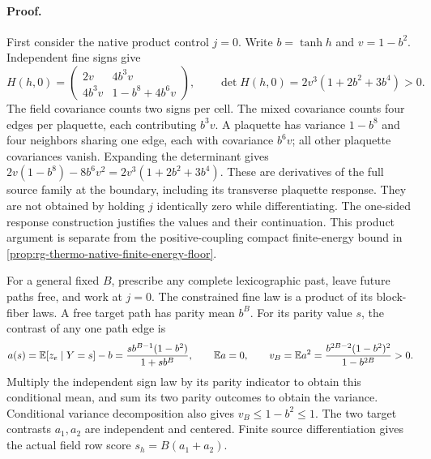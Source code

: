 \paragraph{Proof.}
First consider the native product control \(j=0\). Write
\(b=\tanh h\) and \(v=1-b^2\). Independent fine signs give
\begin{equation}
 H(h,0)=\begin{pmatrix}
 2v&4b^3v\\
 4b^3v&1-b^8+4b^6v
 \end{pmatrix},\qquad
 \det H(h,0)=2v^3(1+2b^2+3b^4)>0.
 \label{eq:rg-thermo-native-product-hessian}
\end{equation}
The field covariance counts two signs per cell. The mixed covariance
counts four edges per plaquette, each contributing \(b^3v\). A plaquette
has variance \(1-b^8\) and four neighbors sharing one edge, each with
covariance \(b^6v\); all other plaquette covariances vanish. Expanding
the determinant gives
\(2v(1-b^8)-8b^6v^2=2v^3(1+2b^2+3b^4)\).
These are derivatives of the full source family at the boundary, including
its transverse plaquette response. They are not obtained by holding
\(j\) identically zero while differentiating. The one-sided response
construction justifies the values and their continuation. This product
argument is separate from the positive-coupling compact finite-energy
bound in \cref{prop:rg-thermo-native-finite-energy-floor}.

For a general fixed \(B\), prescribe any complete lexicographic past,
leave future paths free, and work at \(j=0\). The constrained fine law
is a product of its block-fiber laws. A free target path has parity mean
\(b^B\). For its parity value \(s\), the contrast of any one path edge is
\begin{equation}
 a(s)=\mathbb E[z_e\mid Y=s]-b
     =\frac{s b^{B-1}(1-b^2)}{1+s b^B},\qquad
 \mathbb E a=0,\qquad
 v_B=\mathbb E a^2=\frac{b^{2B-2}(1-b^2)^2}{1-b^{2B}}>0.
 \label{eq:rg-thermo-native-parity-contrast}
\end{equation}
Multiply the independent sign law by its parity indicator to obtain this
conditional mean, and sum its two parity outcomes to obtain the variance.
Conditional variance decomposition also gives \(v_B\le1-b^2\le1\).
The two target contrasts \(a_1,a_2\) are independent and centered.
Finite source differentiation gives the actual field row score
\(s_h=B(a_1+a_2)\).

